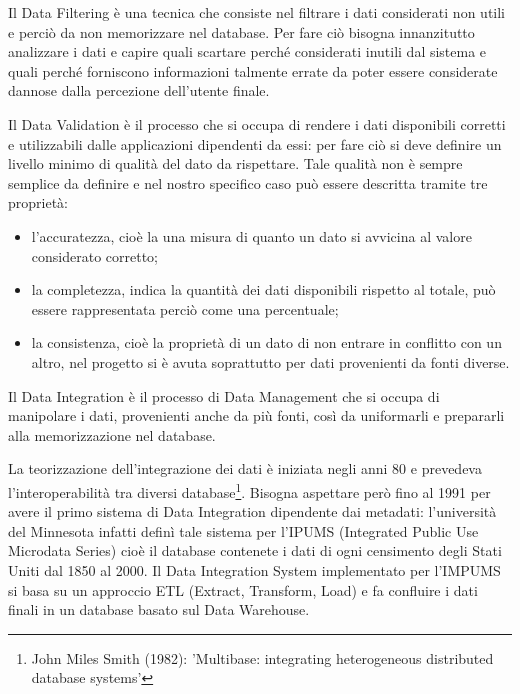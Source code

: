\documentclass[12pt]{report}
\begin{document}
\vspace{5mm} %

Il Data Filtering è una tecnica che consiste nel filtrare i dati considerati non utili e perciò da non memorizzare nel database.
Per fare ciò bisogna innanzitutto analizzare i dati e capire quali scartare perché considerati inutili dal sistema e quali perché forniscono informazioni talmente errate da poter essere considerate dannose dalla percezione dell'utente finale.

\vspace{5mm} %

Il Data Validation è il processo che si occupa di rendere i dati disponibili corretti e utilizzabili dalle applicazioni dipendenti da essi: per fare ciò si deve definire un livello minimo di qualità del dato da rispettare. 
Tale qualità non è sempre semplice da definire e nel nostro specifico caso può essere descritta tramite tre proprietà:
\begin{itemize}
\item l'accuratezza, cioè la una misura di quanto un dato si avvicina al valore considerato corretto;
\item la completezza, indica la quantità dei dati disponibili rispetto al totale, può essere rappresentata perciò come una percentuale;
\item la consistenza, cioè la proprietà di un dato di non entrare in conflitto con un altro, nel progetto si è avuta soprattutto per dati provenienti da fonti diverse.
\end{itemize}

\vspace{5mm} %

Il Data Integration è il processo di Data Management che si occupa di manipolare i dati, provenienti anche da più fonti, così da uniformarli e prepararli alla memorizzazione nel database.

La teorizzazione dell'integrazione dei dati è iniziata negli anni 80 e prevedeva l'interoperabilità tra diversi database\footnote{John Miles Smith (1982): 'Multibase: integrating heterogeneous distributed database systems'}.
Bisogna aspettare però fino al 1991 per avere il primo sistema di Data Integration dipendente dai metadati: l'università del Minnesota infatti definì tale sistema per l'IPUMS (Integrated Public Use Microdata Series) cioè il database contenete i dati di ogni censimento degli Stati Uniti dal 1850 al 2000. 
Il Data Integration System implementato per l'IMPUMS si basa su un approccio ETL (Extract, Transform, Load) e fa confluire i dati finali in un database basato sul Data Warehouse.
\end{document}
